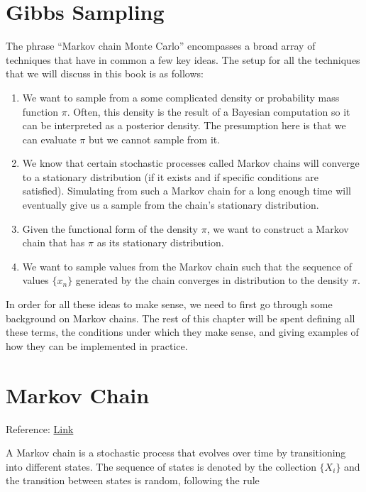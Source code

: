 \section{Gibbs Sampling}

The phrase ``Markov chain Monte Carlo'' encompasses a broad array of techniques that have in common a few key ideas. The setup for all the techniques that we will discuss in this book is as follows:

\begin{enumerate}
	\item We want to sample from a some complicated density or probability mass function $\pi$. Often, this density is the result of a Bayesian computation so it can be interpreted as a posterior density. The presumption here is that we can evaluate $\pi$ but we cannot sample from it.
	\item We know that certain stochastic processes called Markov chains will converge to a stationary distribution (if it exists and if specific conditions are satisfied). Simulating from such a Markov chain for a long enough time will eventually give us a sample from the chain’s stationary distribution.
	\item Given the functional form of the density $\pi$, we want to construct a Markov chain that has $\pi$ as its stationary distribution.
	\item We want to sample values from the Markov chain such that the sequence of values $\{x_n\}$ generated by the chain converges in distribution to the density $\pi$.
\end{enumerate}

In order for all these ideas to make sense, we need to first go through some background on Markov chains. The rest of this chapter will be spent defining all these terms, the conditions under which they make sense, and giving examples of how they can be implemented in practice.

\section{Markov Chain}
Reference: \href{https://gregorygundersen.com/blog/2019/10/28/ergodic-markov-chains/}{Link}

A Markov chain is a stochastic process that evolves over time by transitioning into different states. The sequence of states is denoted by the collection $\{X_i\}$ and the transition between states is random, following the rule 

